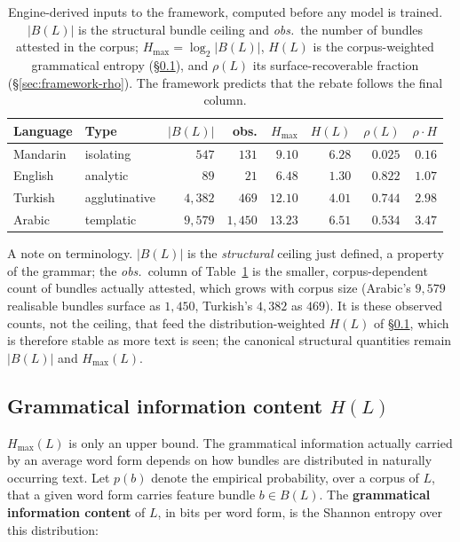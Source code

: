 \begin{table}[H]
\centering
\begin{tabular}{llrrrrrr}
\toprule
Language & Type & $|B(L)|$ & obs. & $H_{\max}$ & $H(L)$ & $\rho(L)$ & $\rho \cdot H$ \\
\midrule
Mandarin & isolating     & $547$   & $131$   & $9.10$  & $6.28$ & $0.025$ & $0.16$ \\
English  & analytic      & $89$    & $21$    & $6.48$  & $1.30$ & $0.822$ & $1.07$ \\
Turkish  & agglutinative & $4{,}382$ & $469$ & $12.10$ & $4.01$ & $0.744$ & $2.98$ \\
Arabic   & templatic     & $9{,}579$ & $1{,}450$ & $13.23$ & $6.51$ & $0.534$ & $3.47$ \\
\bottomrule
\end{tabular}
\caption{Engine-derived inputs to the framework, computed before any model is trained. $|B(L)|$ is the structural bundle ceiling and \emph{obs.}\ the number of bundles attested in the corpus; $H_{\max} = \log_2 |B(L)|$, $H(L)$ is the corpus-weighted grammatical entropy (\S\ref{sec:framework-H}), and $\rho(L)$ its surface-recoverable fraction (\S\ref{sec:framework-rho}). The framework predicts that the rebate follows the final column.}
\label{tab:framework-inputs}
\end{table}

A note on terminology. $|B(L)|$ is the \emph{structural} ceiling just defined, a property of the grammar; the \emph{obs.}\ column of Table~\ref{tab:framework-inputs} is the smaller, corpus-dependent count of bundles actually attested, which grows with corpus size (Arabic's $9{,}579$ realisable bundles surface as $1{,}450$, Turkish's $4{,}382$ as $469$). It is these observed counts, not the ceiling, that feed the distribution-weighted $H(L)$ of \S\ref{sec:framework-H}, which is therefore stable as more text is seen; the canonical structural quantities remain $|B(L)|$ and $H_{\max}(L)$.

\subsection{Grammatical information content $H(L)$}
\label{sec:framework-H}

$H_{\max}(L)$ is only an upper bound. The grammatical information actually carried by an average word form depends on how bundles are distributed in naturally occurring text. Let $p(b)$ denote the empirical probability, over a corpus of $L$, that a given word form carries feature bundle $b \in B(L)$. The \textbf{grammatical information content} of $L$, in bits per word form, is the Shannon entropy over this distribution:

